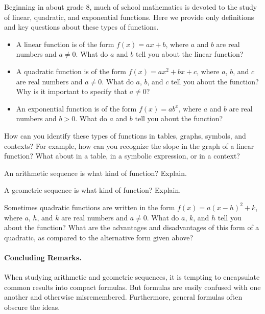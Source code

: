 Beginning in about grade 8, much of school mathematics is devoted to the study of linear, quadratic, and exponential functions.  Here we provide only definitions and key questions about these types of functions.  

\begin{itemize}
\item A linear function is of the form $f(x) = ax + b$, where $a$ and $b$ are real numbers and $a\ne 0$.  What do $a$ and $b$ tell you about the linear function?  
\item A quadratic function is of the form $f(x) = ax^2 + bx + c$, where $a$,  $b$, and $c$ are real numbers and $a\ne 0$.  What do $a$, $b$, and $c$ tell you about the function?  Why is it important to specify that $a\ne 0$? 
\item An exponential function is of the form $f(x)=ab^x$, where $a$ and $b$ are real numbers and $b>0$.  What do $a$ and $b$ tell you about the function? 
\end{itemize}

How can you identify these types of functions in tables, graphs, symbols, and contexts?   
For example, how can you recognize the slope in the graph of a linear function?  What about in a table, in a symbolic expression, or in a context?  

\begin{question}
An arithmetic sequence is what kind of function?  Explain. 
\end{question}
\begin{question}
A geometric sequence is what kind of function?  Explain.  
\end{question}

\begin{question}
Sometimes quadratic functions are written in the form $f(x) = a(x-h)^2+k$, where $a$, $h$, and $k$ are real numbers and $a\ne 0$.  What do $a$, $k$, and $h$ tell you about the function?  What are the advantages and disadvantages of this form of a quadratic, as compared to the alternative form given above?  
\end{question}

\paragraph{Concluding Remarks.}  When studying arithmetic and geometric sequences, it is tempting to encapsulate common results into compact formulas.  But formulas are easily confused with one another and otherwise misremembered.  Furthermore, general formulas often obscure the ideas.  

